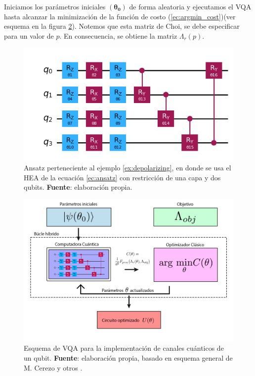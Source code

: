\documentclass[letterpaper,12pt]{thesisECFM}
\theoremstyle{plain}
\theoremstyle{definition}
\theoremstyle{definition}
\theoremstyle{remark}
\newcommand{\1}{\mathbb{1}}
\begin{document}
Iniciamos los parámetros iniciales $(\bm{\theta_0})$ de forma aleatoria y
ejecutamos el VQA hasta alcanzar la minimización de la función de costo
(\ref{ec:argmin_cost})(ver esquema en la figura \ref{fig:esquema_dp}). Notemos
que esta matriz de Choi, se debe especificar para un valor de $p$. En
consecuencia, se obtiene la matriz $\Lambda_r(p)$.
\begin{figure}[h!] 
    \centering 
    \includegraphics[width=0.65\linewidth]{imagenes/ansatz tesis.png}
    \caption{Ansatz perteneciente al ejemplo \ref{ex:depolarizing}, en donde se usa el HEA de la ecuación \ref{ec:ansatz} con restricción de una capa y dos qubits. \textbf{Fuente}: elaboración propia. }
    \label{fig:ansatz_dp}
    \end{figure}
\begin{figure}[h!] 
    \centering 
    \includegraphics[width=0.70\linewidth]{imagenes/esquema_dp_v1.png}
    \caption{Esquema de VQA para la implementación de canales cuánticos de un qubit. \textbf{Fuente}: elaboración propia, basado en esquema general de M. Cerezo y otros \cite{VQA}. }
    \label{fig:esquema_dp}
    \end{figure}
\end{document}
